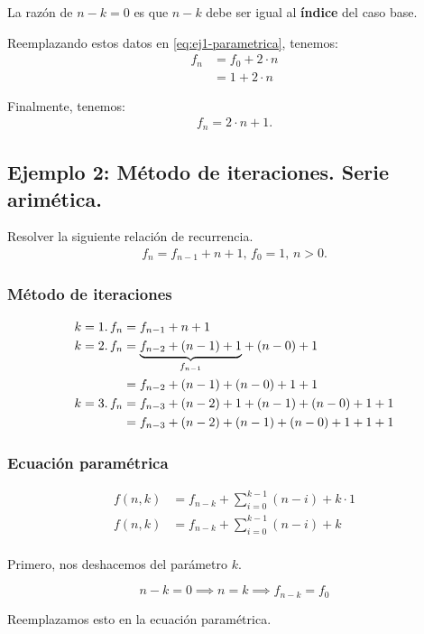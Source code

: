 La razón de $n-k=0$ es que $n-k$ debe ser igual al \textbf{índice} del caso base.

Reemplazando estos datos en \eqref{eq:ej1-parametrica}, tenemos:
\begin{align*}
f_n&=f_0+2\cdot n\\
&=1+2\cdot n
\end{align*}

Finalmente, tenemos:
\begin{align*}
f_n=2\cdot n+1.
\end{align*}

\subsection{Ejemplo 2: Método de iteraciones. Serie arimética.}

Resolver la siguiente relación de recurrencia.
\begin{align*}
f_n=f_{n-1}+n+1,\,f_0=1,\,n>0.
\end{align*}

\subsubsection{Método de iteraciones}
\begin{align*}
k=1.\,f_n&=f_{n-1}+n+1\\
k=2.\,f_n&=\underset{f_{n-1}}{\underbrace{f_{n-2}+(n-1)+1}}+(n-0)+1\\
&=f_{n-2}+(n-1)+(n-0)+1+1\\
k=3.\,f_n&=f_{n-3}+(n-2)+1+(n-1)+(n-0)+1+1\\
&=f_{n-3}+(n-2)+(n-1)+(n-0)+1+1+1
\end{align*}

\subsubsection{Ecuación paramétrica}

\begin{align*}
f(n,k)&=f_{n-k}+\sum_{i=0}^{k-1}{(n-i)}+k\cdot 1\\
f(n,k)&=f_{n-k}+\sum_{i=0}^{k-1}{(n-i)}+k\\
\end{align*}

Primero, nos deshacemos del parámetro $k$.

$$n-k=0\implies n =k\implies f_{n-k}=f_0$$

Reemplazamos esto en la ecuación paramétrica.

